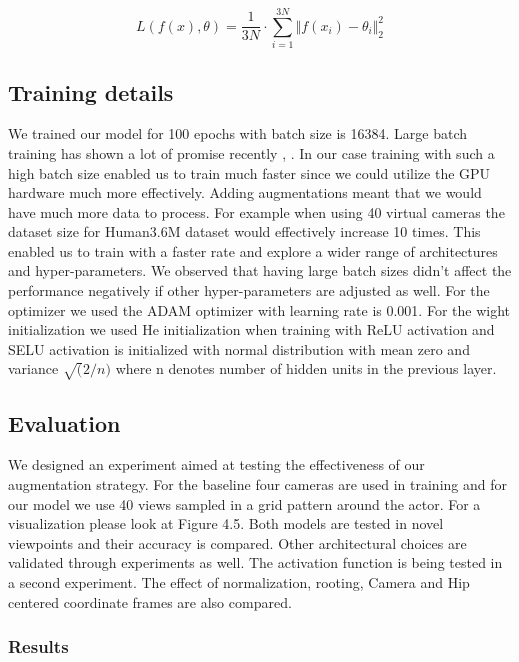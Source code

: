 \begin{equation}	
    L(f(x),\theta) = \frac{1}{3N} \cdot \sum_{i=1}^{3N} {\Vert f(x_i)-\theta_i \Vert}_2^2
\end{equation}


\subsection{Training details}

We trained our model for 100 epochs with batch size is 16384. Large batch training has shown a lot of promise recently \parencite{you2017imagenet}, \parencite{goyal2017accurate}. In our case training with such a high batch size enabled us to train much faster since we could utilize the GPU hardware much more effectively. Adding augmentations meant that we would have much more data to process. For example when using 40 virtual cameras the dataset size for Human3.6M dataset would effectively increase 10 times. This enabled us to train with a faster rate and explore a wider range of architectures and hyper-parameters. We observed that having large batch sizes didn't affect the performance negatively if other hyper-parameters are adjusted as well. For the optimizer we used the ADAM optimizer with learning rate is 0.001. For the wight initialization we used He initialization when training with ReLU activation and SELU activation is initialized with normal distribution with mean zero and variance $\sqrt(2 / n)$ where n denotes number of hidden units in the previous layer. 

\subsection{Evaluation}

We designed an experiment aimed at testing the effectiveness of our augmentation strategy. For the baseline four cameras are used in training and for our model we use 40 views sampled in a grid pattern around the actor. For a visualization please look at Figure 4.5. Both models are tested in novel viewpoints and their accuracy is compared. 
Other architectural choices are validated through experiments as well. The activation function is being tested in a second experiment. The effect of normalization, rooting, Camera and Hip centered coordinate frames are also compared. 

\subsubsection{Results}

